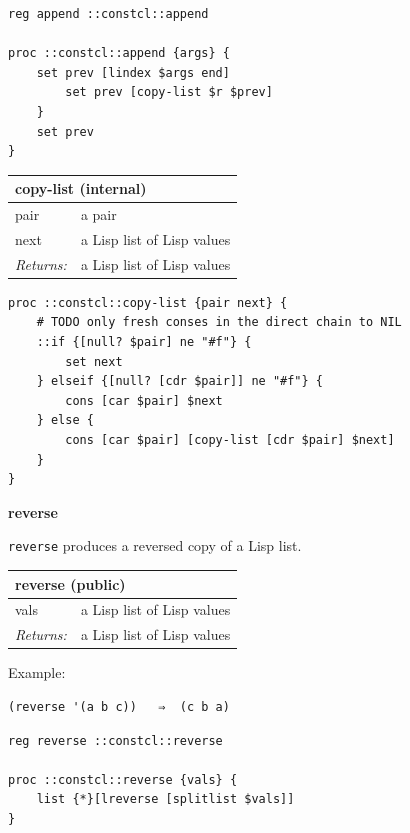 \documentclass[twoside,9pt]{report}
\begin{document}
\noindent\makebox[\linewidth]{\rule{\linewidth}{0.4pt}}
\begin{lstlisting}
reg append ::constcl::append
 
proc ::constcl::append {args} {
    set prev [lindex $args end]
        set prev [copy-list $r $prev]
    }
    set prev
}
\end{lstlisting}
\noindent\makebox[\linewidth]{\rule{\linewidth}{0.4pt}}
\begin{tabular}{ |l l| }
\hline
\multicolumn{2}{|l|}{copy-list (internal)} \\
\hline
pair & a pair \\
next & a Lisp list of Lisp values \\
\textit{Returns:} & a Lisp list of Lisp values \\
\hline
\end{tabular}

\noindent\makebox[\linewidth]{\rule{\linewidth}{0.4pt}}
\begin{lstlisting}
proc ::constcl::copy-list {pair next} {
    # TODO only fresh conses in the direct chain to NIL
    ::if {[null? $pair] ne "#f"} {
        set next
    } elseif {[null? [cdr $pair]] ne "#f"} {
        cons [car $pair] $next
    } else {
        cons [car $pair] [copy-list [cdr $pair] $next]
    }
}
\end{lstlisting}
\noindent\makebox[\linewidth]{\rule{\linewidth}{0.4pt}}

\textbf{reverse}


\texttt{reverse} produces a reversed copy of a Lisp list.

\begin{tabular}{ |l l| }
\hline
\multicolumn{2}{|l|}{reverse (public)} \\
\hline
vals & a Lisp list of Lisp values \\
\textit{Returns:} & a Lisp list of Lisp values \\
\hline
\end{tabular}


Example:

\noindent\makebox[\linewidth]{\rule{\linewidth}{0.4pt}}
\begin{lstlisting}
(reverse '(a b c))   ⇒  (c b a)
\end{lstlisting}
\noindent\makebox[\linewidth]{\rule{\linewidth}{0.4pt}}
\noindent\makebox[\linewidth]{\rule{\linewidth}{0.4pt}}
\begin{lstlisting}
reg reverse ::constcl::reverse
 
proc ::constcl::reverse {vals} {
    list {*}[lreverse [splitlist $vals]]
}
\end{lstlisting}
\noindent\makebox[\linewidth]{\rule{\linewidth}{0.4pt}}
\end{document}
